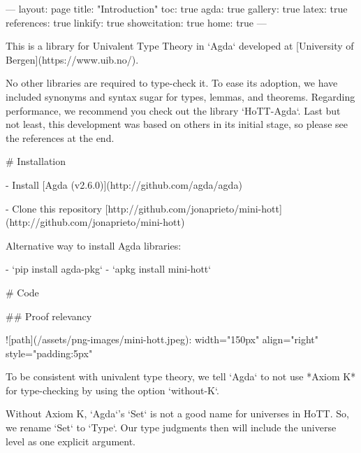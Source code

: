 ---
layout: page
title: "Introduction"
toc: true
agda: true
gallery: true
latex: true
references: true
linkify: true
showcitation: true
home: true
---

This is a library for Univalent Type Theory in `Agda` developed at [University
of Bergen](https://www.uib.no/).

No other libraries are required to type-check it. To ease its adoption, we have
included synonyms and syntax sugar for types, lemmas, and theorems. Regarding
performance, we recommend you check out the library `HoTT-Agda`. Last but not
least, this development was based on others in its initial stage, so please see
the references at the end.

# Installation

- Install [Agda (v2.6.0)](http://github.com/agda/agda)

- Clone this repository [http://github.com/jonaprieto/mini-hott](http://github.com/jonaprieto/mini-hott)

Alternative way to install Agda libraries:

- `pip install agda-pkg`
- `apkg install mini-hott`


# Code

## Proof relevancy

![path](/assets/png-images/mini-hott.jpeg){: width="150px" align="right" style="padding:5px"}

To be consistent with univalent type theory, we tell `Agda` to not use *Axiom K*
for type-checking by using the option `without-K`.

\begin{code}%
\>[0]\AgdaSymbol{\{-\#}\AgdaSpace{}%
\AgdaSpace{}%
\AgdaSpace{}%
\AgdaSymbol{\#-\}}\<%
\end{code}

Without Axiom K, `Agda`'s `Set` is not a good name for universes in HoTT. So, we
rename `Set` to `Type`. Our type judgments then will include the universe level
as one explicit argument.

\begin{code}%
\>[0]\AgdaSpace{}%
\AgdaSpace{}%
\AgdaSpace{}%
\AgdaSpace{}%
\AgdaSymbol{(}\AgdaSpace{}%
\AgdaSpace{}%
\AgdaSymbol{;}\AgdaSpace{}%
\AgdaSymbol{;}\AgdaSpace{}%
\AgdaSymbol{;}\AgdaSpace{}%
\AgdaSpace{}%
\AgdaSymbol{)}\AgdaSpace{}%
\<%
\end{code}

